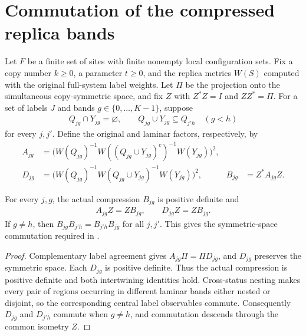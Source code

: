 \section{Commutation of the compressed replica bands}
\label{sec:replica_symmetric_band_commute}

Let $F$ be a finite set of sites with finite nonempty local configuration
sets. Fix a copy number $k\ge0$, a parameter $t\ge0$, and the replica
metrics $W(S)$ computed with the original full-system label weights.
Let $\Pi$ be the projection onto the simultaneous copy-symmetric space,
and fix $Z$ with $Z^*Z=I$ and $ZZ^*=\Pi$.
For a set of labels $J$ and bands $g\in\{0,\ldots,K-1\}$, suppose
\begin{align*}
 Q_{jg}\cap Y_{jg}=\varnothing,\qquad
 Q_{jg}\cup Y_{jg}\subseteq Q_{j'h}\quad(g<h)
\end{align*}
for every $j,j'$. Define the original and laminar factors, respectively, by
\begin{align*}
 A_{jg}&=\bigl(W(Q_{jg})^{-1}W((Q_{jg}\cup Y_{jg})^c)^{-1}W(Y_{jg})\bigr)^2,\\
 D_{jg}&=\bigl(W(Q_{jg})^{-1}W(Q_{jg}\cup Y_{jg})^{-1}W(Y_{jg})\bigr)^2,
 & B_{jg}&=Z^*A_{jg}Z.
\end{align*}

\begin{theorem}
\label{thm:replica_symmetric_band_compressions}
\leanok
For every $j,g$, the actual compression $B_{jg}$ is positive definite and
\begin{align*}
 A_{jg}Z=ZB_{jg},\qquad D_{jg}Z=ZB_{jg}.
\end{align*}
If $g\ne h$, then $B_{jg}B_{j'h}=B_{j'h}B_{jg}$ for all $j,j'$.
This gives the symmetric-space commutation required in
\cite[Section~7, lines~268--276; Section~8, lines~20--37]{OpenAI2026AreaLaw}.
\end{theorem}
\begin{proof}
\leanok
{}
Complementary label agreement gives $A_{jg}\Pi=\Pi D_{jg}$,
and $D_{jg}$ preserves the symmetric space. Each $D_{jg}$ is positive
definite. Thus the actual compression is positive definite and both
intertwining identities hold. Cross-status nesting makes every pair of
regions occurring in different laminar bands either nested or disjoint,
so the corresponding central label observables commute. Consequently
$D_{jg}$ and $D_{j'h}$ commute when $g\ne h$, and commutation descends
through the common isometry $Z$.
\end{proof}

